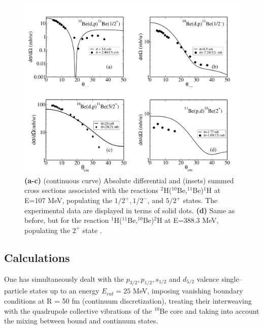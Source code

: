             \begin{figure}
            \centerline{\includegraphics*[width=16cm,angle=0]{C8/figsC8/fig6_2_5}}
            	\caption{ {\bf (a-c)} (continuous curve) Absolute differential and (insets) summed cross sections associated with the reactions  
            	$^2$H($^{10}$Be,$^{11}$Be)$^1$H at E=107 MeV, populating the   ${1/2^+, 1/2^-}$, and ${5/2^+ }$ states.
            	The experimental data  \cite{Schmitt:13}  are displayed in terms of solid dots.
            	{\bf (d)} Same as before, but for the reaction  $^1$H($^{11}$Be,$^{10}$Be)$^2$H at E=388.3 MeV, populating the  ${2^+ }$ state 
            	\cite{Winfield:01}. }\label{fig6.2.5}
            \end{figure} 
\subsection{Calculations}


   One has simultaneously dealt with the $p_{3/2}, p_{1/2},s_{1/2}$ and $d_{5/2}$ valence
   single--particle states up to an energy $E_{cut} = 25$ MeV, imposing 
   vanishing boundary conditions at R = 50 fm (continuum discretization),
   treating their interweaving with the quadrupole collective vibrations
   of the $^{10}$Be core  and  taking into account the mixing 
   between bound and continuum states. 
   
   
   
